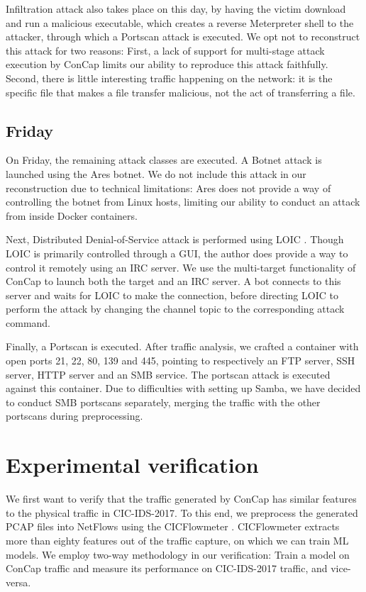 \documentclass[conference]{IEEEtran}
\begin{document}
	Infiltration attack also takes place on this day, by having the victim download and run a malicious executable, which creates a reverse Meterpreter shell to the attacker, through which a Portscan attack is executed. We opt not to reconstruct this attack for two reasons: First, a lack of support for multi-stage attack execution by ConCap limits our ability to reproduce this attack faithfully. Second, there is little interesting traffic happening on the network: it is the specific file that makes a file transfer malicious, not the act of transferring a file. 
	
	\subsection{Friday}
	On Friday, the remaining attack classes are executed. 
	A Botnet attack is launched using the Ares \cite{ares} botnet. We do not include this attack in our reconstruction due to technical limitations: Ares does not provide a way of controlling the botnet from Linux hosts, limiting our ability to conduct an attack from inside Docker containers.
	
	Next, Distributed Denial-of-Service attack is performed using LOIC \cite{loic}. Though LOIC is primarily controlled through a GUI, the author does provide a way to control it remotely using an IRC server. We use the multi-target functionality of ConCap to launch both the target and an IRC server. A bot connects to this server and waits for LOIC to make the connection, before directing LOIC to perform the attack by changing the channel topic to the corresponding attack command.
	
	Finally, a Portscan is executed. After traffic analysis, we crafted a container with open ports 21, 22, 80, 139 and 445, pointing to respectively an FTP server, SSH server, HTTP server and an SMB service. The portscan attack is executed against this container. Due to difficulties with setting up Samba, we have decided to conduct SMB portscans separately, merging the traffic with the other portscans during preprocessing.

	
	\section{Experimental verification}\label{verification}
	
	We first want to verify that the traffic generated by ConCap has similar features to the physical traffic in CIC-IDS-2017. To this end, we preprocess the generated PCAP files into NetFlows using the CICFlowmeter \cite{cicflowmeter}. CICFlowmeter extracts more than eighty features out of the traffic capture, on which we can train ML models. We employ two-way methodology in our verification: Train a model on ConCap traffic and measure its performance on CIC-IDS-2017 traffic, and vice-versa.
	
\end{document}
